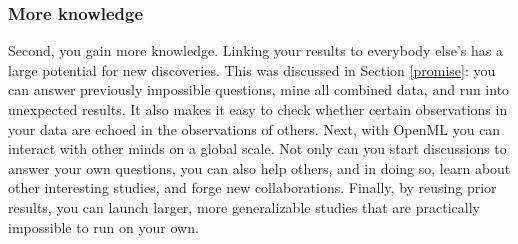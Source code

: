 \documentclass{acmproc-sp}
\begin{document}


\subsubsection{More knowledge}
Second, you gain more knowledge. Linking your results to everybody else's has a large potential for new discoveries. This was discussed in Section \ref{promise}: you can answer previously impossible questions, mine all combined data, and run into unexpected results. It also makes it easy to check whether certain observations in your data are echoed in the observations of others. Next, with OpenML you can interact with other minds on a global scale. Not only can you start discussions to answer your own questions, you can also help others, and in doing so, learn about other interesting studies, and forge new collaborations. Finally, by reusing prior results, you can launch larger, more generalizable studies that are practically impossible to run on your own.
\end{document}

